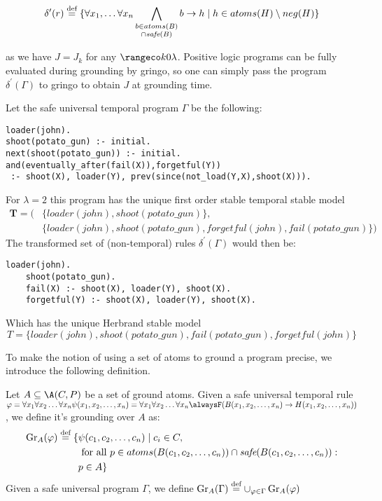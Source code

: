 \begin{equation*} \delta^{\prime}(r) \stackrel{\text{def}}{=} \{ \forall x_1, \dots \forall x_n
  \bigwedge_{\substack{b \in atoms(B)\\ \cap \textit{safe}(B)}}b
  \rightarrow h \mid h \in atoms(H) \setminus neg(H)\}
\end{equation*}

as we have $J = J_k$ for any $\kinlambda$. Positive logic programs can
be fully evaluated during grounding by gringo, so one can simply pass
the program $\delta^{\prime}(\Gamma)$ to gringo to obtain $J$ at
grounding time.

\begin{example}\label{exam:shoot-nonground-safe}
  Let the safe universal temporal program $\Gamma$ be the following:
  \begin{lstlisting}[language=clingo,numbers=none]
loader(john).
shoot(potato_gun) :- initial.
next(shoot(potato_gun)) :- initial.
and(eventually_after(fail(X)),forgetful(Y)) 
 :- shoot(X), loader(Y), prev(since(not_load(Y,X),shoot(X))).
  \end{lstlisting}
  For $\lambda=2$ this program has the unique first order stable
  temporal stable model
  \begin{align*}
  \bm{T} = (&\{ loader(john), shoot(potato\_gun) \},\\
            &\{ loader(john), shoot(potato\_gun), forgetful(john), fail(potato\_gun) \})
  \end{align*}
  The transformed set of (non-temporal) rules
  $\delta^{\prime}(\Gamma)$ would then be:
  \begin{lstlisting}[language=clingo,numbers=none]
    loader(john).
    shoot(potato_gun).
    fail(X) :- shoot(X), loader(Y), shoot(X).
    forgetful(Y) :- shoot(X), loader(Y), shoot(X).
  \end{lstlisting}
  Which has the unique Herbrand stable model
  $$
  T = \{ loader(john), shoot(potato\_gun), fail(potato\_gun), forgetful(john) \}
  $$
\end{example}

To make the notion of using a set of atoms to ground a program
precise, we introduce the following definition.

\begin{definition}
  Let $A \subseteq \A(C,P)$ be a set of ground atoms. Given a safe
  universal temporal rule
  $\varphi = \forallx \psi(x_1,x_2,\dots,x_n) = \forallx \alwaysF
  (B(x_1,x_2,\dots,x_n) \rightarrow H(x_1,x_2,\dots,x_n))$, we define
  it's grounding over $A$ as:
  \begin{align*}
    \operatorname{Gr}_{A}(\varphi) \stackrel{\text{def}}{=} \{ &\psi(c_1,c_2,\dots,c_n) \mid c_i \in C,\\ &\text{ for all } p \in atoms(B(c_1,c_2,\dots,c_n)) \cap \textit{safe}(B(c_1,c_2,\dots,c_n)):\\ &p \in A \}
  \end{align*}
  Given a safe universal program $\Gamma$, we define
  $\operatorname{Gr}_{A}(\Gamma) \stackrel{\text{def}}{=} \cup_{\varphi \in
    \Gamma}\operatorname{Gr}_{A}(\varphi)$
\end{definition}

